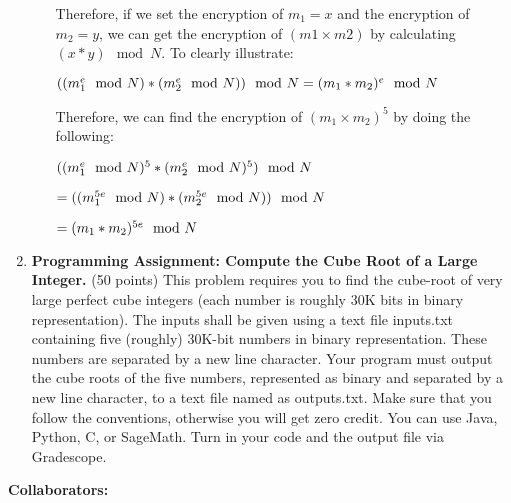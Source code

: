 \documentclass[11pt]{article}
\begin{document}
\begin{enumerate}
\begin{enumerate}
{    Therefore, if we set the encryption of $m_1 = x$ and the encryption of $m_2 = y$, we can get the encryption of $(m1 \times m2)$ by calculating $(x*y)\mod N$. To clearly illustrate: \newline

    $((m_1^e\mod N)*(m_2^e\mod N))\mod N = (m_1 * m_2)^e \mod N \newline$ \newline

    Therefore, we can find the encryption of $(m_1 \times m_2)^5$ by doing the following: \newline

    $((m_1^e\mod N)^5*(m_2^e\mod N)^5)\mod N \newline$

    $= ((m_1^{5e}\mod N)*(m_2^{5e}\mod N))\mod N \newline$

    $= (m_1 * m_2)^{5e} \mod N \newline$ \newline
   }
\end{enumerate}
    \newpage


\item {\bfseries Programming Assignment: Compute the Cube Root of a Large Integer.} (50 points)\newline
This problem requires you to find the cube-root of very large perfect cube integers (each number is roughly 30K bits in binary representation). 
The inputs shall be given using a text file \textsf{inputs.txt} containing five (roughly) 30K-bit numbers in binary representation.
These numbers are separated by a new line character. 
Your program must output the cube roots of the five numbers, represented as binary and separated by a new line character, to a text file named as \textsf{outputs.txt}.
Make sure that you follow the conventions, otherwise you will get zero credit. 
You can use Java, Python, C, or SageMath. 
Turn in your code and the output file via Gradescope.
\end{enumerate}
\newpage
{\bfseries Collaborators:} \newline 
\end{document}
